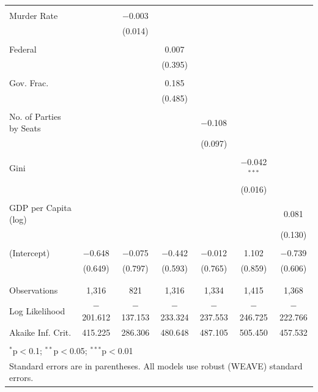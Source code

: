 \documentclass[a4paper]{article}\usepackage[]{graphicx}\usepackage[]{color}
\begin{document}
\begin{table}[H]
\begin{center}
{\begin{tabular}{@{\extracolsep{5pt}}lcccccc}
  & & & & & & \\ 
 Murder Rate &  & $-$0.003 &  &  &  &  \\ 
  &  & (0.014) &  &  &  &  \\ 
  & & & & & & \\ 
 Federal &  &  & 0.007 &  &  &  \\ 
  &  &  & (0.395) &  &  &  \\ 
  & & & & & & \\ 
 Gov. Frac. &  &  & 0.185 &  &  &  \\ 
  &  &  & (0.485) &  &  &  \\ 
  & & & & & & \\ 
 No. of Parties by Seats &  &  &  & $-$0.108 &  &  \\ 
  &  &  &  & (0.097) &  &  \\ 
  & & & & & & \\ 
 Gini &  &  &  &  & $-$0.042$^{***}$ &  \\ 
  &  &  &  &  & (0.016) &  \\ 
  & & & & & & \\ 
 GDP per Capita (log) &  &  &  &  &  & 0.081 \\ 
  &  &  &  &  &  & (0.130) \\ 
  & & & & & & \\ 
 (Intercept) & $-$0.648 & $-$0.075 & $-$0.442 & $-$0.012 & 1.102 & $-$0.739 \\ 
  & (0.649) & (0.797) & (0.593) & (0.765) & (0.859) & (0.606) \\ 
  & & & & & & \\ 
\hline \\[-1.8ex] 
Observations & 1,316 & 821 & 1,316 & 1,334 & 1,415 & 1,368 \\ 
Log Likelihood & $-$201.612 & $-$137.153 & $-$233.324 & $-$237.553 & $-$246.725 & $-$222.766 \\ 
Akaike Inf. Crit. & 415.225 & 286.306 & 480.648 & 487.105 & 505.450 & 457.532 \\ 
\hline 
\hline \\[-1.8ex] 
\multicolumn{7}{l}{$^{*}$p$<$0.1; $^{**}$p$<$0.05; $^{***}$p$<$0.01} \\ 
\multicolumn{7}{l}{Standard errors are in parentheses. All models use robust (WEAVE) standard errors.} \\ 
\end{tabular} 

}
\end{center}
\end{table}
\end{document}
